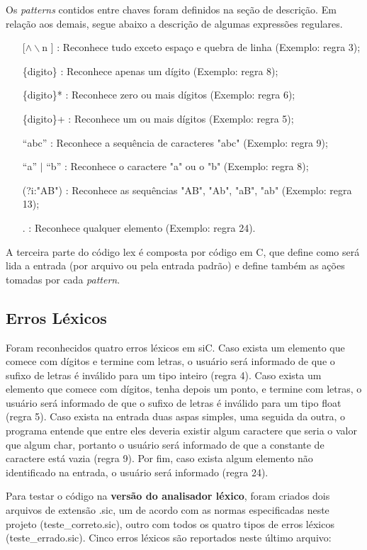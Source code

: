 \documentclass[12pt]{article}
\begin{document}
\indent Os \textit{patterns} contidos entre chaves foram definidos na seção de descrição. Em relação aos demais, segue abaixo a descrição de algumas expressões regulares. 

\begin{itemize}
  \item[ [$\wedge\backslash$n] ] : Reconhece tudo exceto espaço e quebra de linha (Exemplo: regra 3);
  \item[\{digito\}] : Reconhece apenas um dígito (Exemplo: regra 8);
  \item[\{digito\}*] : Reconhece zero ou mais dígitos (Exemplo: regra 6);
  \item[\{digito\}+] : Reconhece um ou mais dígitos (Exemplo: regra 5);
  \item[``abc''] : Reconhece a sequência de caracteres "abc" (Exemplo: regra 9);
  \item[``a'' $\vert$ ``b''] : Reconhece o caractere "a" ou o "b" (Exemplo: regra 8);
  \item[(?i:"AB")] : Reconhece as sequências "AB", "Ab", "aB", "ab" (Exemplo: regra 13);
  \item[.] : Reconhece qualquer elemento (Exemplo: regra 24).
\end{itemize}

\indent A terceira parte do código lex é composta por código em C, que define como será lida a entrada (por arquivo ou pela entrada padrão) e define também as ações tomadas por cada \textit{pattern}.

\subsection{Erros Léxicos}

\indent Foram reconhecidos quatro erros léxicos em siC. Caso exista um elemento que comece com dígitos e termine com letras, o usuário será informado de que o sufixo de letras é inválido para um tipo inteiro (regra 4). Caso exista um elemento que comece com dígitos, tenha depois um ponto, e termine com letras, o usuário será informado de que o sufixo de letras é inválido para um tipo float (regra 5). Caso exista na entrada duas aspas simples, uma seguida da outra, o programa entende que entre eles deveria existir algum caractere que seria o valor que algum char, portanto o usuário será informado de que a constante de caractere está vazia (regra 9). Por fim, caso exista algum elemento não identificado na entrada, o usuário será informado (regra 24).

\indent Para testar o código na \textbf{versão do analisador léxico}, foram criados dois arquivos de extensão .sic, um de acordo com as normas especificadas neste projeto (teste\_correto.sic), outro com todos os quatro tipos de erros léxicos (teste\_errado.sic). Cinco erros léxicos são reportados neste último arquivo:
\end{document}
